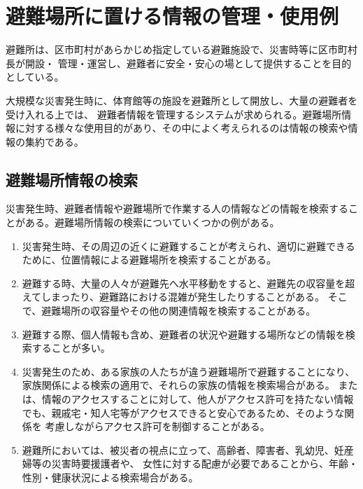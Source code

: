 ﻿%
\chapter{避難場所に置ける情報の管理・使用例}
\label{info_usage}

避難所は、区市町村があらかじめ指定している避難施設で、災害時等に区市町村長が開設・
管理・運営し、避難者に安全・安心の場として提供することを目的としている。

大規模な災害発生時に、体育館等の施設を避難所として開放し、大量の避難者を受け入れる上では、
避難者情報を管理するシステムが求められる。避難場所情報に対する様々な使用目的があり、その中によく考えられるのは情報の検索や情報の集約である。

\section{避難場所情報の検索}

災害発生時、避難者情報や避難場所で作業する人の情報などの情報を検索することがある。避難場所情報の検索についていくつかの例がある。

\begin{enumerate}
	\item 災害発生時、その周辺の近くに避難することが考えられ、適切に避難できるために、位置情報による避難場所を検索することがある。
	\item 避難する時、大量の人々が避難先へ水平移動をすると、避難先の収容量を超えてしまったり、避難路における混雑が発生したりすることがある。
	そこで、避難場所の収容量やその他の関連情報を検索することがある。
	\item 避難する際、個人情報も含め、避難者の状況や避難する場所などの情報を検索することが多い。
	\item 災害発生のため、ある家族の人たちが違う避難場所で避難することになり、家族関係による検索の適用で、それらの家族の情報を検索場合がある。
	または、情報のアクセスすることに対して、他人がアクセス許可を持たない情報でも、親戚宅・知人宅等がアクセスできると安心であるため、そのような関係を
	考慮しながらアクセス許可を制御することがある。
	\item 避難所においては、被災者の視点に立って、高齢者、障害者、乳幼児、妊産婦等の災害時要援護者や、
	女性に対する配慮が必要であることから、年齢・性別・健康状況による検索場合がある。
\end{enumerate}

